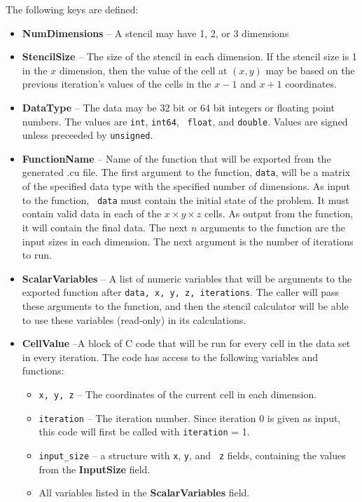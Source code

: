 \documentclass[11pt]{article}
\begin{document}
The following keys are defined:
\begin{itemize}
\item {\bf NumDimensions} -- A stencil may have 1, 2, or 3 dimensions
\item {\bf StencilSize} -- The size of the stencil in each dimension.
  If the stencil size is 1 in the $x$ dimension, then the value of the
  cell at $(x, y)$ may be based on the previous iteration's values of
  the cells in the $x-1$ and $x+1$ coordinates.
\item {\bf DataType} -- The data may be 32 bit or 64 bit integers or
  floating point numbers.  The values are {\tt int}, {\tt int64}, {\tt
    float}, and {\tt double}.  Values are signed unless preceeded by
  {\tt unsigned}.
\item {\bf FunctionName} -- Name of the function that will be exported
  from the generated .cu file.  The first argument to the function,
  {\tt data}, will be a matrix of the specified data type with the
  specified number of dimensions.  As input to the function, {\tt
    data} must contain the initial state of the problem.  It must
  contain valid data in each of the $x \times y \times z$ cells.  As
  output from the function, it will contain the final data.  The next
  $n$ arguments to the function are the input sizes in each dimension.
  The next argument is the number of iterations to run.
\item {\bf ScalarVariables} -- A list of numeric variables that will
  be arguments to the exported function after {\tt data, x, y, z,
    iterations}.  The caller will pass these arguments to the
  function, and then the stencil calculator will be able to use these
  variables (read-only) in its calculations.
\item {\bf CellValue} --A block of C code that will be run for every
  cell in the data set in every iteration.  The code has access to the
  following variables and functions:
\begin{itemize}
\item {\tt x, y, z} -- The coordinates of the current cell in each
  dimension.
\item {\tt iteration} -- The iteration number.  Since iteration 0 is
  given as input, this code will first be called with {\tt iteration}
  = 1.
\item {\tt input\_size} -- a structure with {\tt x}, {\tt y}, and {\tt
  z} fields, containing the values from the {\bf InputSize} field.
\item All variables listed in the {\bf ScalarVariables} field.

\end{itemize}
\end{itemize}
\end{document}
